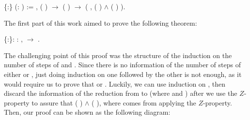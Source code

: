 \documentclass{llncs}
\begin{document}
\begin{coqdoccode}
  \coqdocnoindent{} 
  \{:\} (: 
  ) := \coqdockw{\ensuremath{\forall}} 
   , ( )
    \ensuremath{\rightarrow}
  ( )  
  \ensuremath{\rightarrow} (\coqdoctac{\ensuremath{\exists}}
  , ( ) 
   \ensuremath{\land} (
  )  ).\coqdoceol
\end{coqdoccode}

The first part of this work aimed to prove the following theorem:

\begin{coqdoccode}
\coqdocnoindent
{}  \{:\}: \coqdockw{\ensuremath{\forall}} :  ,   \ensuremath{\rightarrow}  .\coqdoceol
\end{coqdoccode}
  
The challenging point of this proof was the structure of the induction on the number of steps of     and    . Since there is no information of the number of steps of either     or    , just doing induction on one followed by the other is not enough, as it would require us to prove that     or    . Luckily, we can use induction on    , then discard the information of the reduction from  to  (where    and    ) after we use the $Z$-property to assure that    ( ) \ensuremath{\land}    ( ), where   comes from applying the $Z$-property. Then, our proof can be shown as the following diagram:
\end{document}
